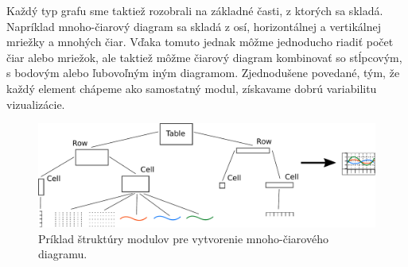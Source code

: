 Každý typ grafu sme taktiež rozobrali na základné časti, z ktorých sa skladá. Napríklad mnoho-čiarový diagram sa skladá z osí, horizontálnej a vertikálnej mriežky a mnohých čiar. Vďaka tomuto jednak môžme jednoducho riadiť počet čiar alebo mriežok, ale taktiež môžme čiarový diagram kombinovať so stĺpcovým, s bodovým alebo ľubovoľným iným diagramom. Zjednodušene povedané, tým, že každý element chápeme ako samostatný modul, získavame dobrú variabilitu vizualizácie.

\begin{figure}
	\centering
	\hspace*{-0.2in}
	\includegraphics[width = 6in]{tree}
	\caption{Príklad štruktúry modulov pre vytvorenie mnoho-čiarového diagramu.}
	\label{fig:tree} 
\end{figure}
